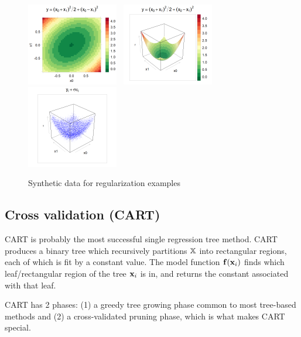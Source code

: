 \documentclass[11pt,openany,american,usenames,dvipsnames,svgnames,x11names,table,isodate]{article}
\numberwithin{equation}{section}
\numberwithin{figure}{section}
\begin{document}
\begin{figure}
\noindent \begin{centering}
\includegraphics[width=40mm]{fig/reg-true-levelplot}~
\includegraphics[width=40mm]{fig/reg-true-wireframe}~
\includegraphics[width=40mm]{fig/rpart-training-data}
\par\end{centering}

\protect\caption{\label{fig:synthetic-data}Synthetic data for regularization examples}
\end{figure}



\subsection{\label{ite:Cross-validation}Cross validation (CART)}

CART \cite{breiman-friedman-olshen-stone-1984,hastie-tibshirani-friedman-2009}
is probably the most successful single regression tree method. CART
produces a binary tree which recursively partitions $\mathbb{X}$ into
rectangular regions, each of which is fit by a constant value. The
model function ${\mathbf f}({\mathbf x}_{i})$ finds which leaf/rectangular region of
the tree ${\mathbf x}_{i}$ is in, and returns the constant associated with
that leaf. 

CART has 2 phases: (1) a greedy tree growing phase common to most
tree-based methods and (2) a cross-validated pruning phase, which
is what makes CART special. 
\end{document}
